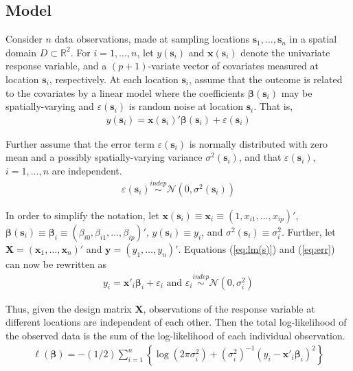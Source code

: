 \documentclass[authoryear, review, 11pt]{elsarticle}
\begin{document}
	\subsection{Model}	
	Consider $n$ data observations, made at sampling locations $\bm{s}_1, \dots, \bm{s}_n$ in a spatial domain $D \subset \mathbb{R}^2$. For $i = 1, \dots, n$, let $y(\bm{s}_i)$ and $\bm{x}(\bm{s}_i)$ denote the univariate response variable, and a $(p+1)$-variate vector of covariates measured at location $\bm{s}_i$, respectively. At each location $\bm{s}_i$, assume that the outcome is related to the covariates by a linear model where the coefficients $\bm{\beta}(\bm{s}_i)$ may be spatially-varying and $\varepsilon(\bm{s}_i)$ is random noise at location $\bm{s}_i$. That is,
	\begin{align}\label{eq:lm(s)}
		y(\bm{s}_i) = \bm{x}(\bm{s}_i)' \bm{\beta}(\bm{s}_i) + \varepsilon(\bm{s}_i)
	\end{align}
	
	Further assume that the error term $\varepsilon(\bm{s}_i)$ is normally distributed with zero mean and a possibly spatially-varying variance $\sigma^2(\bm{s}_i)$, and that $\varepsilon(\bm{s}_i)$, $i=1, \dots, n$ are independent.
	\begin{align} \label{eq:err}
		\varepsilon(\bm{s}_i) \overset{indep}{\sim} \mathcal{N} \left( 0,\sigma^2(\bm{s}_i) \right)
	\end{align}
	
	In order to simplify the notation, let $\bm{x}(\bm{s}_i) \equiv \bm{x}_i \equiv \left( 1, x_{i1}, \dots, x_{ip} \right)'$, $\bm{\beta}(\bm{s}_i) \equiv \bm{\beta}_i \equiv \left(\beta_{i0}, \beta_{i1}, \dots, \beta_{ip} \right)'$, $y(\bm{s}_i) \equiv y_i$, and $\sigma^2(\bm{s}_i) \equiv \sigma^2_i$. Further, let $\bm{X} = \left( \bm{x}_1, \dots, \bm{x}_n \right)'$ and $\bm{y} = \left( y_1, \dots, y_n \right)'$. Equations (\ref{eq:lm(s)}) and (\ref{eq:err}) can now be rewritten as
	\begin{align}
		y_i = \bm{x}'_i \bm{\beta}_i + \varepsilon_i \text{ and } \varepsilon_i \overset{indep}{\sim} \mathcal{N} \left( 0,\sigma_i^2 \right)
	\end{align}
	
	Thus, given the design matrix $\bm{X}$, observations of the response variable at different locations are independent of each other. Then the total log-likelihood of the observed data is the sum of the log-likelihood of each individual observation.
	 \begin{align}
	 	\ell\left( \bm{\beta} \right) = - \left(1/2\right) \sum_{i=1}^n \left\{  \log \left( 2 \pi \sigma^2_i\right) +  \left(\sigma^{2}_i\right)^{-1}  \left(y_i - \bm{x}'_i\bm{\beta}_i \right)^2  \right\}
	\end{align}
	
\end{document}
